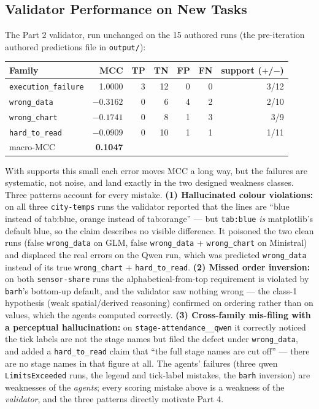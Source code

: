 \documentclass[11pt]{article}
\begin{document}
\subsection{Validator Performance on New Tasks}
The Part 2 validator, run unchanged on the 15 authored runs
(the pre-iteration authored predictions file in \texttt{output/}):

\begin{center}
\begin{tabular}{lrrrrrr}
\toprule
Family & MCC & TP & TN & FP & FN & support ($+$/$-$) \\
\midrule
\texttt{execution\_failure} & 1.0000 & 3 & 12 & 0 & 0 & 3/12 \\
\texttt{wrong\_data} & $-0.3162$ & 0 & 6 & 4 & 2 & 2/10 \\
\texttt{wrong\_chart} & $-0.1741$ & 0 & 8 & 1 & 3 & 3/9 \\
\texttt{hard\_to\_read} & $-0.0909$ & 0 & 10 & 1 & 1 & 1/11 \\
\midrule
macro-MCC & \textbf{0.1047} & & & & & \\
\bottomrule
\end{tabular}
\end{center}

With supports this small each error moves MCC a long way, but the failures
are systematic, not noise, and land exactly in the two designed weakness
classes. Three patterns account for every mistake. \textbf{(1) Hallucinated
colour violations:} on all three \texttt{city-temps} runs the validator
reported that the lines are ``blue instead of tab:blue, orange instead of
tab:orange'' --- but \texttt{tab:blue} \emph{is} matplotlib's default blue,
so the claim describes no visible difference. It poisoned the two clean runs
(false \texttt{wrong\_data} on GLM, false \texttt{wrong\_data} +
\texttt{wrong\_chart} on Ministral) and displaced the real errors on the
Qwen run, which was predicted \texttt{wrong\_data} instead of its true
\texttt{wrong\_chart} + \texttt{hard\_to\_read}. \textbf{(2) Missed order
inversion:} on both \texttt{sensor-share} runs the alphabetical-from-top
requirement is violated by \texttt{barh}'s bottom-up default, and the
validator saw nothing wrong --- the class-1 hypothesis (weak spatial/derived
reasoning) confirmed on ordering rather than on values, which the agents
computed correctly. \textbf{(3) Cross-family mis-filing with a perceptual
hallucination:} on \texttt{stage-attendance\_\_qwen} it correctly noticed
the tick labels are not the stage names but filed the defect under
\texttt{wrong\_data}, and added a \texttt{hard\_to\_read} claim that ``the
full stage names are cut off'' --- there are no stage names in that figure
at all. The agents' failures (three qwen \texttt{LimitsExceeded} runs, the
legend and tick-label mistakes, the \texttt{barh} inversion) are weaknesses
of the \emph{agents}; every scoring mistake above is a weakness of the
\emph{validator}, and the three patterns directly motivate Part 4.
\end{document}
